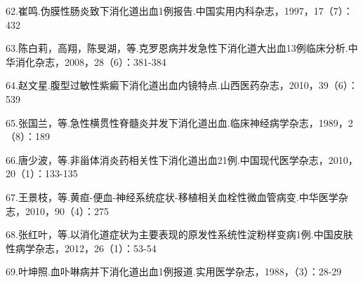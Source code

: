 62.崔鸣.伪膜性肠炎致下消化道出血1例报告.中国实用内科杂志，1997，17（7）：432

63.陈白莉，高翔，陈旻湖，等.克罗恩病并发急性下消化道大出血13例临床分析.中华消化杂志，2008，28（6）：381-384

64.赵文星.腹型过敏性紫癜下消化道出血内镜特点.山西医药杂志，2010，39（6）：539

65.张国兰，等.急性横贯性脊髓炎并发下消化道出血.临床神经病学杂志，1989，2（8）：189

66.唐少波，等.非甾体消炎药相关性下消化道出血21例.中国现代医学杂志，2010，20（1）：133-135

67.王景枝，等.黄疸-便血-神经系统症状-移植相关血栓性微血管病变.中华医学杂志，2010，90（4）：275

68.张红叶，等.以消化道症状为主要表现的原发性系统性淀粉样变病1例.中国皮肤性病学杂志，2012，26（1）：53-54

69.叶坤照.血卟啉病并下消化道出血1例报道.实用医学杂志，1988，（3）：28-29

\protect\hypertarget{text00182.html}{}{}

